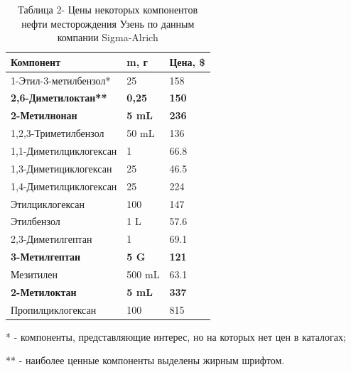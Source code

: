 \begin{table}[H]
\caption*{Таблица 2- Цены некоторых компонентов нефти месторождения Узень по данным компании Sigma-Alrich}
\centering
\begin{tabular}{|l|l|l|}
\hline
\textbf{Компонент}          & \textbf{m, г} & \textbf{Цена, \$} \\ \hline
1-Этил-3-метилбензол*       & 25            & 158              \\ \hline
\textbf{2,6-Диметилоктан**} & \textbf{0,25} & \textbf{150}     \\ \hline
\textbf{2-Метилнонан}       & \textbf{5 mL} & \textbf{236}     \\ \hline
1,2,3-Триметилбензол        & 50 mL         & 136              \\ \hline
1,1-Диметилциклогексан      & 1             & 66.8             \\ \hline
1,3-Диметициклогексан       & 25            & 46.5             \\ \hline
1,4-Диметилциклогексан      & 25            & 224              \\ \hline
Этилциклогексан             & 100           & 147              \\ \hline
Этилбензол                  & 1 L           & 57.6             \\ \hline
2,3-Диметилгептан           & 1             & 69.1             \\ \hline
\textbf{3-Метилгептан}      & \textbf{5 G}  & \textbf{121}     \\ \hline
Мезитилен                   & 500 mL        & 63.1             \\ \hline
\textbf{2-Метилоктан}       & \textbf{5 mL} & \textbf{337}     \\ \hline
Пропилциклогексан           & 100           & 815              \\ \hline
\end{tabular}
\end{table}

\begin{center}
\begin{noparindent}
* - компоненты, представляющие интерес, но на которых нет цен в
каталогах;

** - наиболее ценные компоненты выделены жирным шрифтом.
\end{noparindent}
\end{center}

